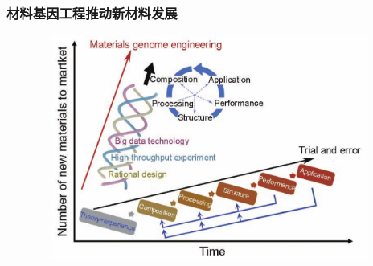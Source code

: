 \begin{frame}
	\frametitle{材料基因工程推动新材料发展}
\begin{figure}[h!]
\vspace*{-0.25in}
\centering
\includegraphics[height=2.90in,width=4.80in,viewport=0 0 1250 710,clip]{Figures/MGE_idea.png}
\label{MGE_idea}
\end{figure}
\end{frame}


